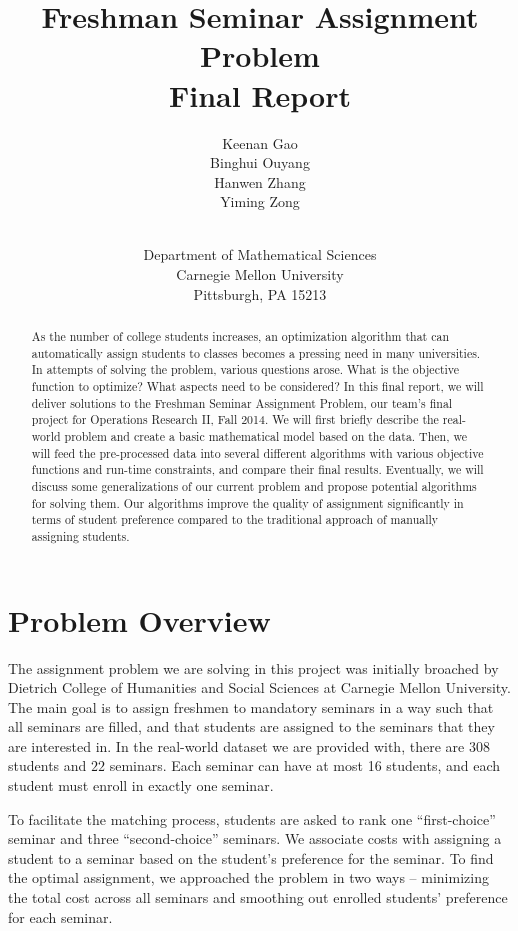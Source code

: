 \documentclass{article} %
\title{Freshman Seminar Assignment Problem\\Final Report}
\author{
Keenan Gao \\
\And
Binghui Ouyang \\
\And
Hanwen Zhang \\
\And
Yiming Zong\\ \\
\and Department of Mathematical Sciences \\ Carnegie Mellon University \\ Pittsburgh, PA 15213
}
\begin{document}
\maketitle

\begin{abstract}
    \par\qquad As the number of college students increases, an optimization algorithm that can automatically assign students to classes becomes a pressing need in many universities. In attempts of solving the problem, various questions arose. What is the objective function to optimize? What aspects need to be considered? In this final report, we will deliver solutions to the Freshman Seminar Assignment Problem, our team's final project for Operations Research II, Fall 2014. We will first briefly describe the real-world problem and create a basic mathematical model based on the data. Then, we will feed the pre-processed data into several different algorithms with various objective functions and run-time constraints, and compare their final results. Eventually, we will discuss some generalizations of our current problem and propose potential algorithms for solving them. Our algorithms improve the quality of assignment significantly in terms of student preference compared to the traditional approach of manually assigning students.
\end{abstract}
\vspace{\fill}
\pagebreak

%
%
\section{Problem Overview}
   \par\qquad The assignment problem we are solving in this project was initially broached by Dietrich College of Humanities and Social Sciences at Carnegie Mellon University. The main goal is to assign freshmen to mandatory seminars in a way such that all seminars are filled, and that students are assigned to the seminars that they are interested in. In the real-world dataset we are provided with, there are $308$ students and $22$ seminars. Each seminar can have at most 16 students, and each student must enroll in exactly one seminar.
   \par\qquad To facilitate the matching process, students are asked to rank one ``first-choice'' seminar and three ``second-choice'' seminars. We associate costs with assigning a student to a seminar based on the student's preference for the seminar. To find the optimal assignment, we approached the problem in two ways -- minimizing the total cost across all seminars and smoothing out enrolled students' preference for each seminar.
\end{document}
